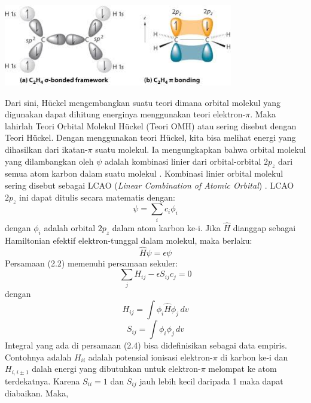 \documentclass[12pt,a4paper]{report}
\begin{document}
	\begin{center}
		\includegraphics[width=10cm]{gambar/etilen.jpeg}
	\end{center}
	
	Dari sini, Hückel mengembangkan suatu teori dimana orbital molekul yang digunakan dapat dihitung energinya menggunakan teori elektron-{$\pi$}. Maka lahirlah Teori Orbital Molekul Hückel (Teori OMH) atau sering disebut dengan Teori Hückel. Dengan menggunakan teori Hückel, kita bisa melihat energi yang dihasilkan dari ikatan-{$\pi$} suatu molekul. Ia mengungkapkan bahwa orbital molekul yang dilambangkan oleh
	{$\psi$} adalah kombinasi linier dari orbital-orbital {$2p_z$} dari semua atom karbon dalam suatu molekul \cite{Rustaman2008}. Kombinasi linier orbital molekul sering disebut sebagai LCAO (\textit{Linear Combination of Atomic Orbital}) \cite{Maczynski1991}. LCAO {$2p_z$} ini dapat ditulis secara matematis dengan:
	\begin{equation}
	{\psi} = \sum\limits_{i} c_i{\phi}_i
	\end{equation}
	dengan {$\phi_i$} adalah orbital {$2p_z$} dalam atom karbon ke-i. Jika $\hat{H}$ dianggap sebagai Hamiltonian efektif elektron-tunggal dalam molekul, maka berlaku:
	\begin{equation}
	\hat{H}\psi = \epsilon\psi
	\end{equation}
	Persamaan (2.2) memenuhi persamaan sekuler:
	\begin{equation}
	\sum\limits_{j} {H_{ij}}-{\epsilon}{S_{ij}}c_j=0
	\end{equation}
	dengan
	\begin{equation}
	H_{ij} = \int {\phi_i}{\hat{H}}{\phi_j} \,dv
	\end{equation}
	\begin{equation}
	S_{ij} = \int {\phi_i}{\phi_j} \,dv
	\end{equation}
	Integral yang ada di persamaan (2.4) bisa didefinisikan sebagai data empiris. Contohnya adalah {$H_{ii}$} adalah potensial ionisasi elektron-{$\pi$} di karbon ke-i dan {$H_{i,i{\pm}1}$} dalah energi yang dibutuhkan untuk elektron-{$\pi$} melompat ke atom terdekatnya. Karena {$S_{ii}=1$} dan {$S_{ij}$} jauh lebih kecil daripada 1 maka dapat diabaikan. Maka,
\end{document}

